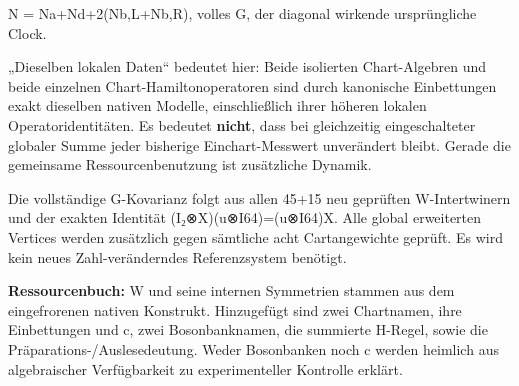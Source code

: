 N = Na+Nd+2(Nb,L+Nb,R), volles G, der diagonal wirkende ursprüngliche
Clock.

„Dieselben lokalen Daten`` bedeutet hier: Beide isolierten
Chart-Algebren und beide einzelnen Chart-Hamiltonoperatoren sind durch
kanonische Einbettungen exakt dieselben nativen Modelle, einschließlich
ihrer höheren lokalen Operatoridentitäten. Es bedeutet \textbf{nicht},
dass bei gleichzeitig eingeschalteter globaler Summe jeder bisherige
Einchart-Messwert unverändert bleibt. Gerade die gemeinsame
Ressourcenbenutzung ist zusätzliche Dynamik.

Die vollständige G-Kovarianz folgt aus allen 45+15 neu geprüften
W-Intertwinern und der exakten Identität (I₂⊗X)(u⊗I64)=(u⊗I64)X. Alle
global erweiterten Vertices werden zusätzlich gegen sämtliche acht
Cartangewichte geprüft. Es wird kein neues Zahl-veränderndes
Referenzsystem benötigt.

\textbf{Ressourcenbuch:} W und seine internen Symmetrien stammen aus dem
eingefrorenen nativen Konstrukt. Hinzugefügt sind zwei Chartnamen, ihre
Einbettungen und c, zwei Bosonbanknamen, die summierte H-Regel, sowie
die Präparations-/Auslesedeutung. Weder Bosonbanken noch c werden
heimlich aus algebraischer Verfügbarkeit zu experimenteller Kontrolle
erklärt.


